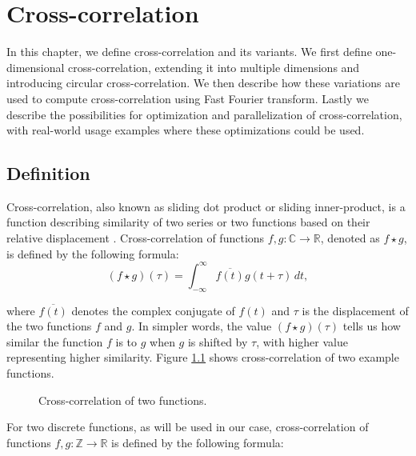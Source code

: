 
\chapter{Cross-correlation}
\label{sec:cross-corr}

In this chapter, we define cross-correlation and its variants. We first define one-dimensional cross-correlation, extending it into multiple dimensions and introducing circular cross-correlation. We then describe how these variations are used to compute cross-correlation using Fast Fourier transform. Lastly we describe the possibilities for optimization and parallelization of cross-correlation, with real-world usage examples where these optimizations could be used.


\section{Definition}

Cross-correlation, also known as sliding dot product or sliding inner-product, is a function describing similarity of two series or two functions based on their relative displacement \citep{site:wiki_cross_corr}.
Cross-correlation of functions $f,g: \mathbb{C} \rightarrow \mathbb{R}$, denoted as \(f \star g\), is defined by the following formula:
\[
	(f \star g)(\tau) = \int_{-\infty}^{\infty} \overline{f(t)}g(t + \tau) \,dt,
\] 

where \(\overline{f(t)}\) denotes the complex conjugate of \(f(t)\) and \(\tau\) is the displacement of the two functions \(f\) and \(g\). In simpler words, the value \((f \star g)(\tau)\) tells us how similar the function \(f\) is to \(g\) when \(g\) is shifted by \(\tau\), with higher value representing higher similarity. Figure \ref{fig:cross_corr_example} shows cross-correlation of two example functions.

\begin{figure}[h]
	\centering
	\def\svgwidth{0.8\textwidth}
	
	\caption{Cross-correlation of two functions. \cite{pic:crosscorr}}
	\label{fig:cross_corr_example}
\end{figure}

For two discrete functions, as will be used in our case, cross-correlation of functions \( f, g : \mathbb{Z} \rightarrow \mathbb{R} \) is defined by the following formula:

